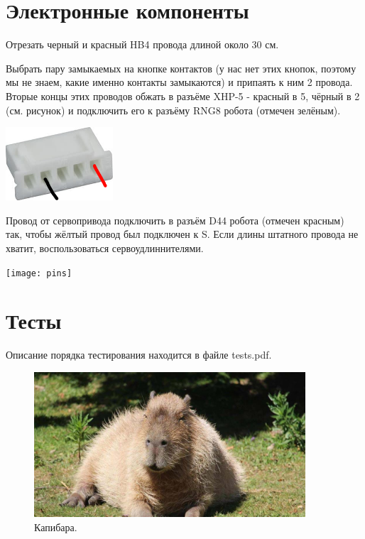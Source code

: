 \documentclass[12pt,a4paper,oneside]{article}
\begin{document}
\section{Электронные компоненты}
Отрезать черный и красный HB4 провода длиной около 30 см.

Выбрать пару замыкаемых на кнопке контактов (у нас нет этих кнопок, поэтому мы
не знаем, какие именно контакты замыкаются) и припаять к ним 2 провода. Вторые
концы этих проводов обжать в разъёме XHP-5 - красный в 5, чёрный в 2 (см.
рисунок) и подключить его к разъёму RNG8 робота (отмечен зелёным).

\includegraphics[width=0.3\textwidth]{buttoncontacts}

Провод от сервопривода подключить в разъём D44 робота (отмечен красным) так,
чтобы жёлтый провод был подключен к S. Если длины штатного провода не хватит,
воспользоваться сервоудлиннителями.

\texttt{[image: pins]}

\section{Тесты}
Описание порядка тестирования находится в файле tests.pdf.

\newpage

\begin{figure}
\centering
\includegraphics[width=0.9\textwidth]{capybara.jpg}
\caption{\label{fig:capybara}Капибара.}
\end{figure}
\end{document}
